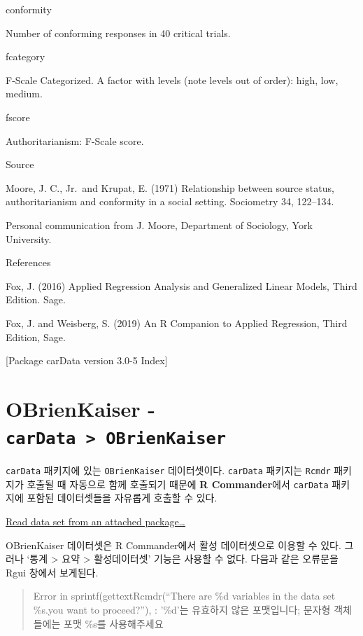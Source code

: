 \documentclass[
]{book}
\begin{document}
conformity

Number of conforming responses in 40 critical trials.

fcategory

F-Scale Categorized.
A factor with levels (note levels out of order):
high,
low,
medium.

fscore

Authoritarianism: F-Scale score.

Source

Moore, J. C., Jr.~and Krupat, E. (1971)
Relationship between source status, authoritarianism and conformity in a
social setting. Sociometry 34, 122--134.

Personal communication
from J. Moore, Department of Sociology, York University.

References

Fox, J. (2016)
Applied Regression Analysis and Generalized Linear Models,
Third Edition. Sage.

Fox, J. and Weisberg, S. (2019)
An R Companion to Applied Regression, Third Edition, Sage.

{[}Package carData version 3.0-5 Index{]}

\hypertarget{obrienkaiser---cardata-obrienkaiser}{%
\section{\texorpdfstring{OBrienKaiser - \texttt{carData\ \textgreater{}\ OBrienKaiser}}{OBrienKaiser - carData \textgreater{} OBrienKaiser}}\label{obrienkaiser---cardata-obrienkaiser}}

\texttt{carData} 패키지에 있는 \texttt{OBrienKaiser} 데이터셋이다. \texttt{carData} 패키지는 \texttt{Rcmdr} 패키지가 호출될 때 자동으로 함께 호출되기 때문에 \textbf{R Commander}에서 \texttt{carData} 패키지에 포함된 데이터셋들을 자유롭게 호출할 수 있다.

\href{https://rcmdr.kr/37}{Read data set from an attached package\ldots{}}

OBrienKaiser 데이터셋은 R Commander에서 활성 데이터셋으로 이용할 수 있다. 그러나 `통계 \textgreater{} 요약 \textgreater{} 활성데이터셋' 기능은 사용할 수 없다. 다음과 같은 오류문을 Rgui 창에서 보게된다.

\begin{quote}
Error in sprintf(gettextRcmdr(``There are \%d variables in the data set \%s.\nDo you want to proceed?''), :
'\%d'는 유효하지 않은 포맷입니다; 문자형 객체들에는 포맷 \%s를 사용해주세요
\end{quote}
\end{document}
